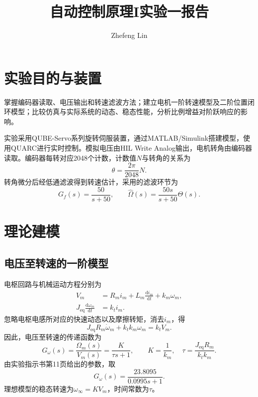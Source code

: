 \documentclass[12pt]{article}
\title{自动控制原理I实验一报告}
\author{Zhefeng Lin}
\date{}
\begin{document}
\maketitle
\section{实验目的与装置}
掌握编码器读取、电压输出和转速滤波方法；建立电机一阶转速模型及二阶位置闭环模型；比较仿真与实际系统的动态、稳态性能，分析比例增益对阶跃响应的影响。

实验采用QUBE-Servo系列旋转伺服装置，通过MATLAB/Simulink搭建模型，使用QUARC进行实时控制。模拟电压由HIL Write Analog输出，电机转角由编码器读取。编码器每转对应2048个计数，计数值$N$与转角的关系为
\begin{equation}
 \theta=\frac{2\pi}{2048}N.
\end{equation}
转角微分后经低通滤波得到转速估计，采用的滤波环节为
\begin{equation}
 G_f(s)=\frac{50}{s+50},\qquad
 \widehat\Omega(s)=\frac{50s}{s+50}\Theta(s).
\end{equation}

\section{理论建模}
\subsection{电压至转速的一阶模型}
电枢回路与机械运动方程分别为
\begin{align}
 V_m&=R_m i_m+L_m\frac{\mathrm di_m}{\mathrm dt}+k_m\omega_m,\\
 J_{\mathrm{eq}}\frac{\mathrm d\omega_m}{\mathrm dt}&=k_t i_m.
\end{align}
忽略电枢电感所对应的快速动态以及摩擦转矩，消去$i_m$，得
\begin{equation}
 J_{\mathrm{eq}}R_m\dot\omega_m+k_tk_m\omega_m=k_tV_m.
\end{equation}
因此，电压至转速的传递函数为
\begin{equation}
 G_\omega(s)=\frac{\Omega_m(s)}{V_m(s)}
 =\frac{K}{\tau s+1},\qquad
 K=\frac1{k_m},\quad \tau=\frac{J_{\mathrm{eq}}R_m}{k_tk_m}.
\end{equation}
由实验指示书第11页给出的参数，取
\begin{equation}
 G_\omega(s)=\frac{23.8095}{0.0995s+1}.
\end{equation}
理想模型的稳态转速为$\omega_\infty=KV_m$，时间常数为$\tau$。
\end{document}
